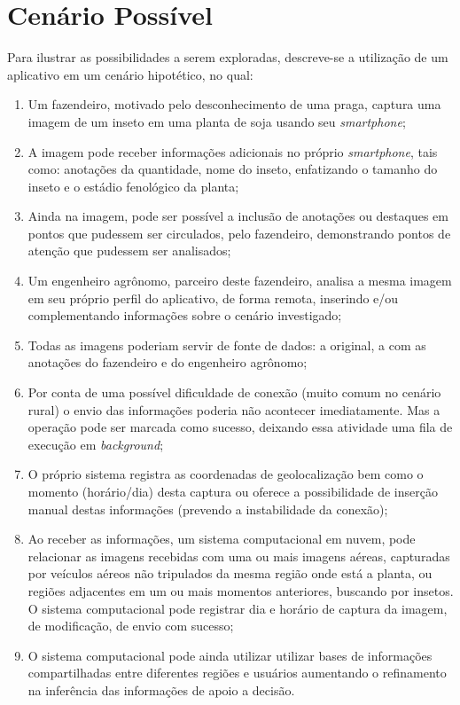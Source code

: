 \documentclass[12pt]{article}
\begin{document}
\section{Cenário Possível}
\label{ape:cenario_possivel}

Para ilustrar as possibilidades a serem exploradas, descreve-se a utilização de um aplicativo em um cenário hipotético, no qual:

\begin{enumerate}
	\item Um fazendeiro, motivado pelo desconhecimento de uma praga, captura uma imagem de um inseto em uma planta de soja usando seu \textit{smartphone};
	\item A imagem pode receber informações adicionais no próprio \textit{smartphone}, tais como: anotações da quantidade, nome do inseto, enfatizando o tamanho do inseto e o estádio fenológico da planta;
	\item Ainda na imagem, pode ser possível a inclusão de anotações ou destaques em pontos que pudessem ser circulados, pelo fazendeiro, demonstrando pontos de atenção que pudessem ser analisados;
	\item Um engenheiro agrônomo, parceiro deste fazendeiro, analisa a mesma imagem em seu próprio perfil do aplicativo, de forma remota, inserindo e/ou complementando informações sobre o cenário investigado;
	\item Todas as imagens poderiam servir de fonte de dados: a original, a com as anotações do fazendeiro e do engenheiro agrônomo;
	\item Por conta de uma possível dificuldade de conexão (muito comum no cenário rural) o envio das informações poderia não acontecer imediatamente. Mas a operação pode ser marcada como sucesso, deixando essa atividade uma fila de execução em \textit{background};
	\item O próprio sistema registra as coordenadas de geolocalização bem como o momento (horário/dia) desta captura ou oferece a possibilidade de inserção manual destas informações (prevendo a instabilidade da conexão);
	\item Ao receber as informações, um sistema computacional em nuvem, pode relacionar as imagens recebidas com uma ou mais imagens aéreas, capturadas por veículos aéreos não tripulados da mesma região onde está a planta, ou regiões adjacentes em um ou mais momentos anteriores, buscando por insetos. O sistema computacional pode registrar dia e horário de captura da imagem, de modificação, de envio com sucesso;
	\item O sistema computacional pode ainda utilizar utilizar bases de informações compartilhadas entre diferentes regiões e usuários aumentando o refinamento na inferência das informações de apoio a decisão.
\end{enumerate}
\end{document}
